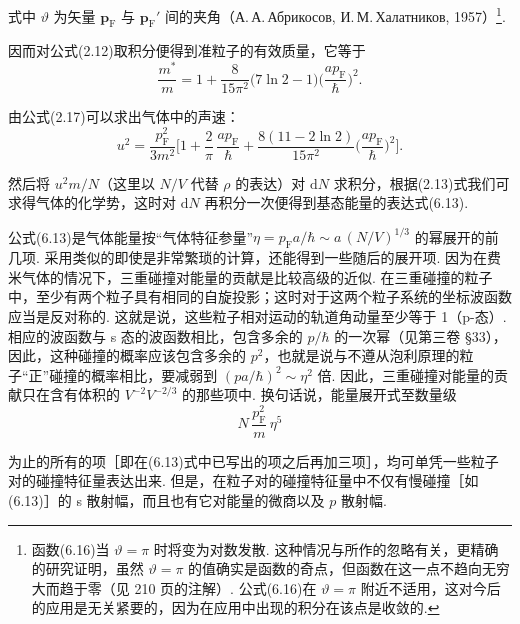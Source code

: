 式中 $\vartheta$ 为矢量 $\bm p_{\mathrm F}$ 与 $\bm p_{\mathrm F}'$ 间的夹角（А.\,А.\,Абрикосов, И.\,М.\,Халатников, 1957）\footnote{函数(6.16)当 $\vartheta=\pi$ 时将变为对数发散. 这种情况与所作的忽略有关，更精确的研究证明，虽然 $\vartheta=\pi$ 的值确实是函数的奇点，但函数在这一点不趋向无穷大而趋于零（见 210 页的注解）. 公式(6.16)在 $\vartheta=\pi$ 附近不适用，这对今后的应用是无关紧要的，因为在应用中出现的积分在该点是收敛的.}.

因而对公式(2.12)取积分便得到准粒子的有效质量，它等于
\begin{equation}
\frac{m^{*}}{m}=1+\frac{8}{15\pi^{2}}\bigl(7\ln 2-1\bigr)\biggl(\frac{ap_{\mathrm F}}{\hbar}\biggr)^{2}.
\end{equation}

由公式(2.17)可以求出气体中的声速：
\begin{equation}
u^{2}=\frac{p_{\mathrm F}^{2}}{3m^{2}}\biggl[1+\frac{2}{\pi}\,\frac{ap_{\mathrm F}}{\hbar}
+\frac{8(11-2\ln 2)}{15\pi^{2}}\biggl(\frac{ap_{\mathrm F}}{\hbar}\biggr)^{2}\biggr].
\end{equation}

然后将 $u^{2}m/N$（这里以 $N/V$ 代替 $\rho$ 的表达）对 $\mathrm{d}N$ 求积分，根据(2.13)式我们可求得气体的化学势，这时对 $\mathrm{d}N$ 再积分一次便得到基态能量的表达式(6.13).

公式(6.13)是气体能量按“气体特征参量”$\eta=p_{\mathrm F}a/\hbar\sim a\,(N/V)^{1/3}$ 的幂展开的前几项. 采用类似的即使是非常繁琐的计算，还能得到一些随后的展开项. 因为在费米气体的情况下，三重碰撞对能量的贡献是比较高级的近似. 在三重碰撞的粒子中，至少有两个粒子具有相同的自旋投影；这时对于这两个粒子系统的坐标波函数应当是反对称的. 这就是说，这些粒子相对运动的轨道角动量至少等于 1（p-态）. 相应的波函数与 s 态的波函数相比，包含多余的 $p/\hbar$ 的一次幂（见第三卷 §33），因此，这种碰撞的概率应该包含多余的 $p^{2}$，也就是说与不遵从泡利原理的粒子“正”碰撞的概率相比，要减弱到 $(pa/\hbar)^{2}\sim\eta^{2}$ 倍. 因此，三重碰撞对能量的贡献只在含有体积的 $V^{-2}V^{-2/3}$ 的那些项中. 换句话说，能量展开式至数量级
\begin{equation*}
N\,\frac{p_{\mathrm F}^{2}}{m}\,\eta^{5}
\end{equation*}

为止的所有的项［即在(6.13)式中已写出的项之后再加三项］，均可单凭一些粒子对的碰撞特征量表达出来. 但是，在粒子对的碰撞特征量中不仅有慢碰撞［如(6.13)］的 s 散射幅，而且也有它对能量的微商以及 $p$ 散射幅.
